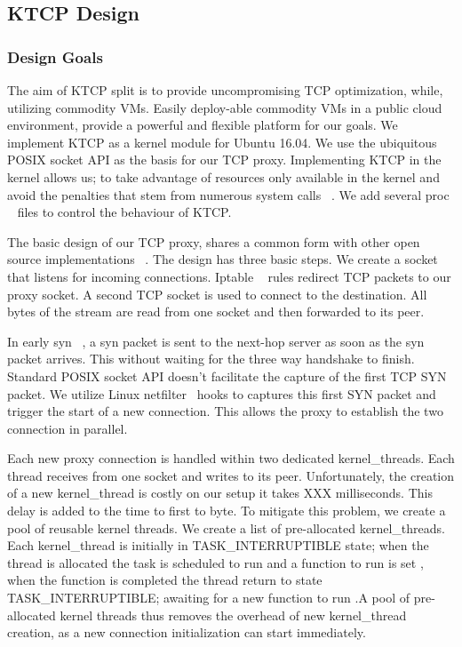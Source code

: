 \subsection{KTCP Design} \label{sec:design}
\subsubsection{Design Goals}
The aim of KTCP split is to provide uncompromising TCP optimization, while, utilizing commodity VMs. Easily deploy-able commodity VMs in a public cloud environment, provide a powerful and flexible platform for our goals. We implement KTCP as a kernel module for Ubuntu 16.04. We use the ubiquitous POSIX socket API as the basis for our TCP proxy.  
Implementing KTCP in the kernel allows us; to take advantage of resources only available in the kernel and avoid the penalties that stem from numerous system calls ~\cite{Copy, FlexSC}. We add several proc ~\cite{proc} files to control the behaviour of KTCP. 

 The basic design of our TCP proxy, shares a common form with other open source implementations ~\cite{SOCKS, WhatEverAranIsUsing}. The design has three basic steps. We create a socket that listens for incoming connections. Iptable ~\cite{iptables} rules redirect TCP packets to our proxy socket. A second TCP socket is used to connect to the destination. All bytes of the stream are read from one socket and then forwarded to its peer.

 In early syn ~\cite{Ladiwala}, a syn packet is sent to the next-hop server as soon as the syn packet arrives. This without waiting for the three way handshake to finish. Standard POSIX socket API doesn't facilitate the capture of the first TCP SYN packet. We utilize Linux netfilter~\cite{netfilter} hooks to captures this first SYN packet and trigger the start of a new connection. This allows the proxy to establish the two connection in parallel. 

 Each new proxy connection is handled within two dedicated kernel\_threads. Each thread receives from one socket and writes to its peer. Unfortunately, the creation of a new kernel\_thread is costly on our setup it takes XXX milliseconds. This delay is added to the time to first to byte. To mitigate this problem, we create a pool of reusable kernel threads. We create a list of pre-allocated kernel\_threads. Each kernel\_thread is initially in TASK\_INTERRUPTIBLE state; when the thread is allocated the task is scheduled to run and a function to run is set , when the function is completed the thread return to state TASK\_INTERRUPTIBLE; awaiting for a new function to run .A pool of pre-allocated kernel threads thus removes the overhead of new kernel\_thread creation, as a new connection initialization can start immediately.

